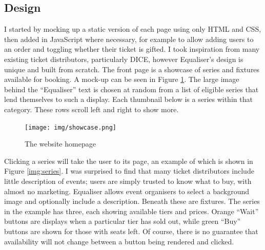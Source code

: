 \documentclass[12pt,a4paper]{bhamdissertation}
\begin{document}
\subsection{Design}

I started by mocking up a static version of each page using only HTML and CSS, then added in JavaScript where necessary, for example to allow adding users to an order and toggling whether their ticket is gifted. I took inspiration from many existing ticket distributors, particularly DICE, however Equaliser's design is unique and built from scratch. The front page is a showcase of series and fixtures available for booking. A mock-up can be seen in Figure \ref{img:showcase}. The large image behind the ``Equaliser'' text is chosen at random from a list of eligible series that lend themselves to such a display. Each thumbnail below is a series within that category. These rows scroll left and right to show more.

\begin{figure}[!htbp]
    \centering
    \texttt{[image: img/showcase.png]}
    \caption{The website homepage}
    \label{img:showcase}
\end{figure}

Clicking a series will take the user to its page, an example of which is shown in Figure \ref{img:series}. I was surprised to find that many ticket distributors include little description of events; users are simply trusted to know what to buy, with almost no marketing. Equaliser allows event organisers to select a background image and optionally include a description. Beneath these are fixtures. The series in the example has three, each showing available tiers and prices. Orange ``Wait'' buttons are displays when a particular tier has sold out, while green ``Buy'' buttons are shown for those with seats left. Of course, there is no guarantee that availability will not change between a button being rendered and clicked.
\end{document}
